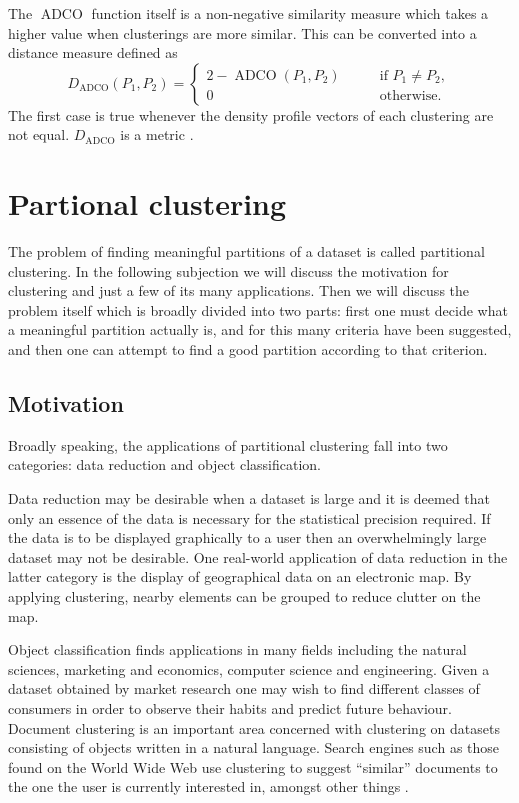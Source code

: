 \documentclass[a4paper]{report}
\DeclareMathOperator{\ADCO}{ADCO}
\begin{document}
The $\ADCO$ function itself is a non-negative similarity measure which takes a
higher value when clusterings are more similar.  This can be converted into a
distance measure defined as
\begin{equation*}
  D_{\ADCO}(P_1,P_2) =
  \begin{cases}
    2 - \ADCO(P_1,P_2) & \qquad \text{if $P_1 \neq P_2$},\\
    0 & \qquad \text{otherwise}.
  \end{cases}
\end{equation*}
The first case is true whenever the density profile vectors of each clustering
are not equal.  $D_{\ADCO}$ is a metric \citep{bae-2010}.

\section{Partional clustering}
\label{sec:part-clust-algor}

The problem of finding meaningful partitions of a dataset is called
partitional clustering.  In the following subjection we will discuss the
motivation for clustering and just a few of its many applications.  Then we
will discuss the problem itself which is broadly divided into two parts: first
one must decide what a meaningful partition actually is, and for this many
criteria have been suggested, and then one can attempt to find a good
partition according to that criterion.

\subsection{Motivation}
\label{sec:part-clus-motivation}

Broadly speaking, the applications of partitional clustering fall into two
categories: data reduction and object classification.

Data reduction may be desirable when a dataset is large and it is deemed that
only an essence of the data is necessary for the statistical precision
required.  If the data is to be displayed graphically to a user then an
overwhelmingly large dataset may not be desirable.  One real-world application
of data reduction in the latter category is the display of geographical data
on an electronic map.  By applying clustering, nearby elements can be grouped
to reduce clutter on the map.

Object classification finds applications in many fields including the natural
sciences, marketing and economics, computer science and engineering.  Given a
dataset obtained by market research one may wish to find different classes of
consumers in order to observe their habits and predict future behaviour.
Document clustering is an important area concerned with clustering on datasets
consisting of objects written in a natural language.  Search engines such as
those found on the World Wide Web use clustering to suggest ``similar''
documents to the one the user is currently interested in, amongst other things
\citep{steinbach2000comparison}.
\end{document}
